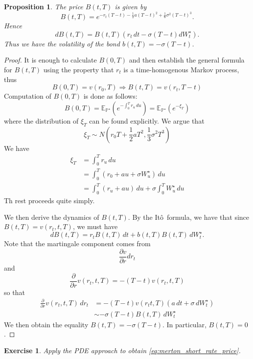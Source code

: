 \documentclass[10pt, oneside, reqno]{amsbook}
\theoremstyle{plain}%
\newtheorem{prop}[thm]{Proposition}
\newtheorem{exer}[thm]{Exercise}
\theoremstyle{definition}
\theoremstyle{remark}
\newcommand{\E}{\mathbb{E}}
\renewcommand{\P}{\mathbb{P}}
\newcommand{\ito}{It\^o\ }
\numberwithin{equation}{chapter}
\begin{document}
	\begin{prop}
		The price $B(t, T)$ is given by \begin{equation}
			\label{eq:merton_short_rate_price}
			B(t, T) = e^{-r_t(T-t) - \frac{1}{2}a(T-t)^2 + \frac{1}{6} \sigma^2(T-t)^3}.  
		\end{equation}  Hence \[
			dB(t, T) = B(t, T)\left(r_t \, dt - \sigma(T-t) dW^\star_t \right).
		\]  Thus we have the volatility of the bond $b(t, T) = -\sigma(T-t)$.
	\end{prop}
	
	\begin{proof}
		It is enough to calculate $B(0, T)$ and then establish the general formula for $B(t, T)$ using the property that $r_t$ is a time-homogenous Markov process, thus \[
			B(0, T) = v(r_0, T) \Rightarrow B(t, T) =v(r_t, T-t)
		\]
		Computation of $B(0, T)$ is done as follows:\[
			B(0, T) = \E_{\P^\star} \left(e^{-\int_0^T r_u \, du} \right) = \E_{\P^\star} \left( e^{-\xi_T} \right)
		\] where the distribution of $\xi_T$ can be found explicitly.  We argue that \[
			\xi_T \sim N\left(r_0 T + \frac{1}{2} a T^2, \frac{1}{3} \sigma^2 T^3 \right)
		\]  We have \begin{align*}
			\xi_T 	&= \int_0^T r_u \, du \\
					&= \int_0^T \left( r_0 + au + \sigma W^\star_u \right) \, du \\
					&= \int_0^T (r_u + au)  \, du + \sigma \int_0^T W^\star_u \, du
		\end{align*}
		Th rest proceeds quite simply.
		
		We then derive the dynamics of $B(t, T)$.  By the \ito formula, we have that since $B(t, T) = v(r_t, t, T)$, we must have \[
			dB(t, T) = r_t B(t, T) \, dt + b(t, T) B(t, T) \, dW^\star_t.  
		\] Note that the martingale component comes from \[
			\frac{\partial v}{\partial r} dr_t 
		\] and \[
			\frac{\partial}{\partial r}v(r_t, t, T) = -(T- t) v(r_t, t, T)
		\] so that \begin{align*}
			\frac{\partial}{\partial r}v(r_t, t, T) \, dr_t &= -(T-t) v(r_t t, T) (a \, dt + \sigma \, dW^\star_t) \\
			&\sim - \sigma(T- t)B(t, T) \, dW^\star_t
		\end{align*}  We then obtain the equality $B(t, T) = -\sigma(T-t)$.  In particular, $B(t, T) = 0$.  
	\end{proof}
	
	\begin{exer}
		Apply the PDE approach to obtain \eqref{eq:merton_short_rate_price}.
	\end{exer}
	
\end{document}
